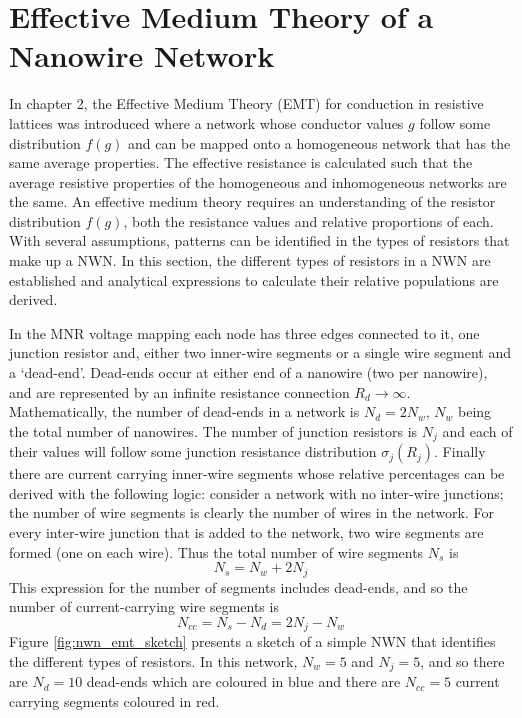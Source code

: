 \section{Effective Medium Theory of a Nanowire Network}
\label{Sec: NWN EMT}
In chapter 2, the Effective Medium Theory (EMT) for conduction in resistive lattices\cite{kirkpatrick1973} was introduced where a network whose conductor values $g$ follow some distribution $f(g)$ and can be mapped onto a homogeneous network that has the same average properties. The effective resistance is calculated such that the average resistive properties of the homogeneous and inhomogeneous networks are the same. An effective medium theory requires an understanding of the resistor distribution $f(g)$, both the resistance values and relative proportions of each. With several assumptions, patterns can be identified in the types of resistors that make up a NWN. In this section, the different types of resistors in a NWN are established and analytical expressions to calculate their relative populations are derived. 

In the MNR voltage mapping each node has three edges connected to it, one junction resistor and, either two inner-wire segments or a single wire segment and a `dead-end'\cite{ocallaco2016}. Dead-ends occur at either end of a nanowire (two per nanowire), and are represented by an infinite resistance connection $R_d \rightarrow \infty$. Mathematically, the number of dead-ends in a network is $N_d = 2 N_w$, $N_w$ being the total number of nanowires. The number of junction resistors is $N_j$ and each of their values will follow some junction resistance distribution $\sigma_j(R_j)$. Finally there are current carrying inner-wire segments whose relative percentages can be derived with the following logic: consider a network with no inter-wire junctions; the number of wire segments is clearly the number of wires in the network. For every inter-wire junction that is added to the network, two wire segments are formed (one on each wire). Thus the total number of wire segments $N_s$ is
\begin{equation}
N_s = N_w + 2 N_j
\end{equation}
This expression for the number of segments includes dead-ends, and so the number of current-carrying wire segments is 
\begin{equation}
N_{cc} = N_s - N_d = 2 N_j - N_w
\end{equation}
Figure \ref{fig:nwn_emt_sketch} presents a sketch of a simple NWN that identifies the different types of resistors. In this network, $N_w = 5$ and $N_j = 5$, and so there are $N_d = 10$ dead-ends which are coloured in blue and there are $N_{cc} = 5$ current carrying segments coloured in red.

